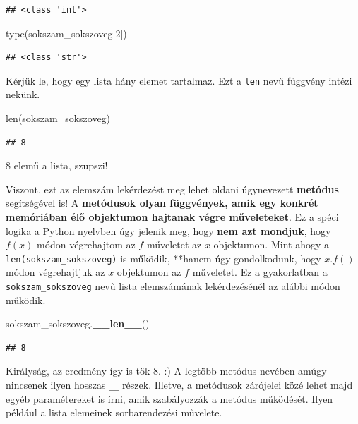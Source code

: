 \documentclass[
]{book}
\newenvironment{Shaded}{\begin{snugshade}}{\end{snugshade}}
\newcommand{\BuiltInTok}[1]{#1}
\newcommand{\DecValTok}[1]{\textcolor[rgb]{0.00,0.00,0.81}{#1}}
\newcommand{\FunctionTok}[1]{\textcolor[rgb]{0.13,0.29,0.53}{\textbf{#1}}}
\newcommand{\NormalTok}[1]{#1}
\begin{document}
\begin{verbatim}
## <class 'int'>
\end{verbatim}

\begin{Shaded}
\begin{Highlighting}[]
\BuiltInTok{type}\NormalTok{(sokszam\_sokszoveg[}\DecValTok{2}\NormalTok{])}
\end{Highlighting}
\end{Shaded}

\begin{verbatim}
## <class 'str'>
\end{verbatim}

Kérjük le, hogy egy lista hány elemet tartalmaz. Ezt a \texttt{len} nevű függvény intézi nekünk.

\begin{Shaded}
\begin{Highlighting}[]
\BuiltInTok{len}\NormalTok{(sokszam\_sokszoveg)}
\end{Highlighting}
\end{Shaded}

\begin{verbatim}
## 8
\end{verbatim}

8 elemű a lista, szupszi!

Viszont, ezt az elemszám lekérdezést meg lehet oldani úgynevezett \textbf{metódus} segítségével is! A \textbf{metódusok olyan függvények, amik egy konkrét memóriában élő objektumon hajtanak végre műveleteket}. Ez a spéci logika a Python nyelvben úgy jelenik meg, hogy \textbf{nem azt mondjuk}, hogy \(f(x)\) módon végrehajtom az \(f\) műveletet az \(x\) objektumon. Mint ahogy a \texttt{len(sokszam\_sokszoveg)} is működik, **hanem úgy gondolkodunk, hogy \(x.f()\) módon végrehajtjuk az \(x\) objektumon az \(f\) műveletet.
Ez a gyakorlatban a \texttt{sokszam\_sokszoveg} nevű lista elemszámának lekérdezésénél az alábbi módon működik.

\begin{Shaded}
\begin{Highlighting}[]
\NormalTok{sokszam\_sokszoveg.}\FunctionTok{\_\_len\_\_}\NormalTok{()}
\end{Highlighting}
\end{Shaded}

\begin{verbatim}
## 8
\end{verbatim}

Királyság, az eredmény így is tök \(8\). :) A legtöbb metódus nevében amúgy nincsenek ilyen hosszas \texttt{\_\_} részek. Illetve, a metódusok zárójelei közé lehet majd egyéb paramétereket is írni, amik szabályozzák a metódus működését. Ilyen például a lista elemeinek sorbarendezési művelete.
\end{document}
